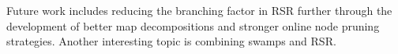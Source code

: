 
\par
Future work includes reducing the branching factor in RSR further through the 
development of better map decompositions and stronger online node pruning
strategies.
Another interesting topic is combining swamps and RSR.


